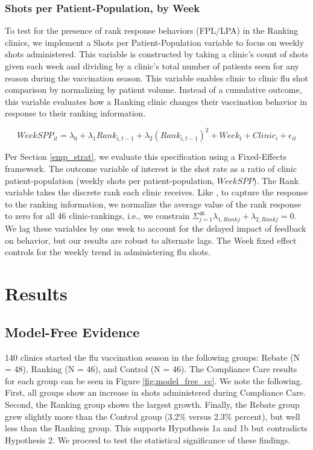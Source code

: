 \begin{onehalfspace}
 \subsubsection{Shots per Patient-Population, by Week}
 To test for the presence of rank response behaviors (FPL/LPA) in the Ranking clinics, we implement a Shots per Patient-Population variable to focus on weekly shots administered. This variable is constructed by taking a clinic’s count of shots given each week and dividing by a clinic’s total number of patients seen for any reason during the vaccination season. This variable enables clinic to clinic flu shot comparison by normalizing by patient volume. Instead of a cumulative outcome, this variable evaluates how a Ranking clinic changes their vaccination behavior in response to their ranking information. 
 
 \begin{equation} \label{rank_resp} %
       WeekSPP_{it} = \lambda_0 + \lambda_1 Rank_{i,t-1} + \lambda_2 (Rank_{i,t-1})^2 + Week_t + Clinic_i + \epsilon_{it}
 \end{equation} 
 
 Per Section \ref{emp_strat}, we evaluate this specification using a Fixed-Effects framework. The outcome variable of interest is the shot rate as a ratio of clinic patient-population (weekly shots per patient-population, $WeekSPP$). The Rank variable takes the discrete rank each clinic receives. Like \cite{Gill2019}, to capture the response to the ranking information, we normalize the average value of the rank response to zero for all 46 clinic-rankings, i.e., we constrain $ \Sigma^{46}_{j=1} \lambda_{1,Rank j} + \lambda_{2,Rank j} = 0$. We lag these variables by one week to account for the delayed impact of feedback on behavior, but our results are robust to alternate lags. The Week fixed effect controls for the weekly trend in administering flu shots.
 
\section{Results} \label{Results_CC}
 \subsection{Model-Free Evidence}
 140 clinics started the flu vaccination season in the following groups: Rebate (N = 48), Ranking (N = 46), and Control (N = 46).  The Compliance Care results for each group can be seen in Figure \ref{fig:model_free_cc}. We note the following. First, all groups show an increase in shots administered during Compliance Care. Second, the Ranking group shows the largest growth. Finally, the Rebate group grew slightly more than the Control group (3.2\% versus 2.3\% percent), but well less than the Ranking group. This supports Hypothesis 1a and 1b but contradicts Hypothesis 2. We proceed to test the statistical significance of these findings.
 

\end{onehalfspace}
